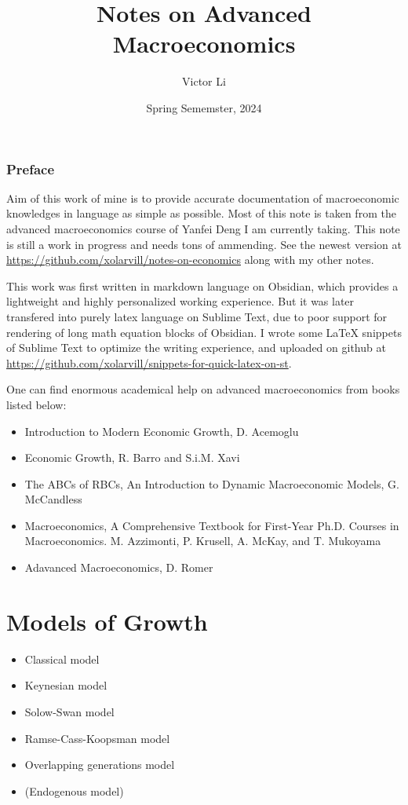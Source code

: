 \documentclass{article}
\title{Notes on Advanced Macroeconomics}
\author{Victor Li}
\date{Spring Sememster, 2024}
\providecommand{\tightlist}{
  \setlength{\itemsep}{0pt}
  \setlength{\parskip}{0pt}}
\begin{document}
\maketitle

\newpage
\tableofcontents

\newpage
{}
\section*{Preface}

Aim of this work of mine is to provide accurate documentation of macroeconomic knowledges in language as simple as possible. Most of this note is taken from the advanced macroeconomics course of Yanfei Deng I am currently taking. This note is still a work in progress and needs tons of ammending. See the newest version at \url{https://github.com/xolarvill/notes-on-economics} along with my other notes.

This work was first written in markdown language on Obsidian, which provides a lightweight and highly personalized working experience. But it was later transfered into purely latex language on Sublime Text, due to poor support for rendering of long math equation blocks of Obsidian. I wrote some LaTeX snippets of Sublime Text to optimize the writing experience, and uploaded on github at \url{https://github.com/xolarvill/snippets-for-quick-latex-on-st}.

One can find enormous academical help on advanced macroeconomics from books listed below:
\begin{itemize}
\tightlist
  \item Introduction to Modern Economic Growth, D. Acemoglu
  \item Economic Growth, R. Barro and S.i.M. Xavi
  \item The ABCs of RBCs, An Introduction to Dynamic Macroeconomic Models, G. McCandless
  \item Macroeconomics, A Comprehensive Textbook for First-Year Ph.D. Courses in Macroeconomics. M. Azzimonti, P. Krusell, A. McKay, and T. Mukoyama
  \item Adavanced Macroeconomics, D. Romer
\end{itemize}


\newpage
\part{Models of Growth}

\begin{itemize}
\tightlist
  \item Classical model
  \item Keynesian model
  \item Solow-Swan model
  \item Ramse-Cass-Koopsman model
  \item Overlapping generations model
  \item (Endogenous model)
\end{itemize}
\end{document}
